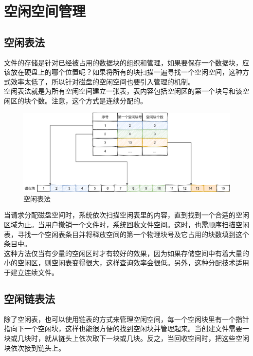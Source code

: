 \newpage

\section{空闲空间管理}

\subsection{空闲表法}

文件的存储是针对已经被占用的数据块的组织和管理，如果要保存一个数据块，应该放在硬盘上的哪个位置呢？如果将所有的块扫描一遍寻找一个空闲空间，这种方式效率太低了，所以针对磁盘的空闲空间也要引入管理的机制。 \\

空闲表法就是为所有空闲空间建立一张表，表内容包括空闲区的第一个块号和该空闲区的块个数。注意，这个方式是连续分配的。

\begin{figure}[H]
	\centering
	\includegraphics[scale=0.25]{img/C5/5-5/1.png}
	\caption{空闲表法}
\end{figure}

当请求分配磁盘空间时，系统依次扫描空闲表里的内容，直到找到一个合适的空闲区域为止。当用户撤销一个文件时，系统回收文件空间。这时，也需顺序扫描空闲表，寻找一个空闲表条目并将释放空间的第一个物理块号及它占用的块数填到这个条目中。 \\

这种方法仅当有少量的空闲区时才有较好的效果，因为如果存储空间中有着大量的小的空闲区，则空闲表变得很大，这样查询效率会很低。另外，这种分配技术适用于建立连续文件。

\subsection{空闲链表法}

除了空闲表，也可以使用链表的方式来管理空闲空间，每一个空闲块里有一个指针指向下一个空闲块，这样也能很方便的找到空闲块并管理起来。当创建文件需要一块或几块时，就从链头上依次取下一块或几块。反之，当回收空间时，把这些空闲块依次接到链头上。

